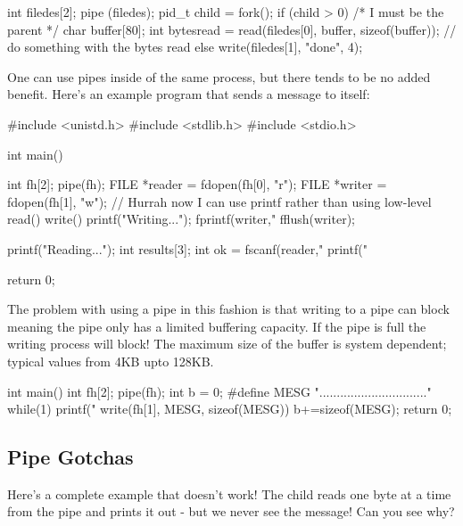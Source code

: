 \begin{enumerate}
\begin{code}[language=C]
int filedes[2];
pipe (filedes);
pid_t child = fork();
if (child > 0) { /* I must be the parent */
    char buffer[80];
    int bytesread = read(filedes[0], buffer, sizeof(buffer));
    // do something with the bytes read    
} else {
	write(filedes[1], "done", 4);
}
\end{code}

One can use pipes inside of the same process, but there tends to be no added benefit. Here's an example program that sends a message to itself:

\begin{code}[language=C]
#include <unistd.h>
#include <stdlib.h>
#include <stdio.h>

int main() {
    int fh[2];
    pipe(fh);
    FILE *reader = fdopen(fh[0], "r");
    FILE *writer = fdopen(fh[1], "w");
    // Hurrah now I can use printf rather than using low-level read() write()
    printf("Writing...\n");
    fprintf(writer,"%
    fflush(writer);
    
    printf("Reading...\n");
    int results[3];
    int ok = fscanf(reader,"%
    printf("%
    
    return 0;
}
\end{code}

The problem with using a pipe in this fashion is that writing to a pipe can block meaning the pipe only has a limited buffering capacity. If the pipe is full the writing process will block! The maximum size of the buffer is system dependent; typical values from 4KB upto 128KB.

\begin{code}[language=C]
int main() {
    int fh[2];
    pipe(fh);
    int b = 0;
    #define MESG "..............................."
    while(1) {
        printf("%
        write(fh[1], MESG, sizeof(MESG))
        b+=sizeof(MESG);
    }
    return 0;
}
\end{code}

\subsection{Pipe Gotchas}\label{pipe-gotchas}

Here's a complete example that doesn't work! The child reads one byte at a time from the pipe and prints it out - but we never see the message! Can you see why?


\end{enumerate}
